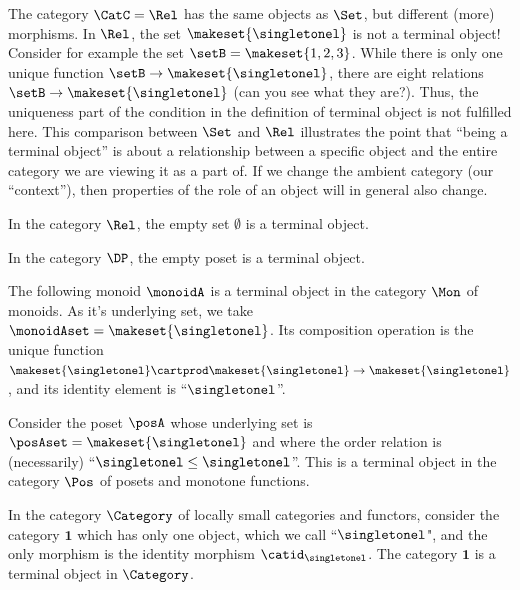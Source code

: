 \begin{remark}
    The category $\CatC = \Rel$ has the same objects as $\Set$, but different (more) morphisms.
    In $\Rel$, the set $\makeset{ \singletonel}$ is not a terminal object! Consider for example the set $\setB = \makeset{1,2,3}$.
    While there is only one unique function $\setB \to \makeset{ \singletonel}$, there are eight relations $\setB \to \makeset{ \singletonel}$ (can you see what they are?).
    Thus, the uniqueness part of the condition in the definition of terminal object is not fulfilled here.
    This comparison between $\Set$ and $\Rel$ illustrates the point that ``being a terminal object'' is about a relationship between a specific object and the entire category we are viewing it as a part of.
    If we change the ambient category (our ``context''), then properties of the role of an object will in general also change.
\end{remark}

\begin{example}\label{exa:term-obj-Rel}
    In the category $\Rel$, the empty set $\emptyset$ is a terminal object.
\end{example}

\begin{example}\label{exa:term-obj-DP}
    In the category $\DP$, the empty poset is a terminal object.
\end{example}

\begin{example}\label{exa:term-obj-Mon}
    The following monoid $\monoidA$ is a terminal object in the category $\Mon$ of monoids.
    As it's underlying set, we take $\monoidAset = \makeset{ \singletonel}$.
    Its composition operation is the unique function $\makeset{ \singletonel} \cartprod \makeset{ \singletonel} \to \makeset{ \singletonel}$, and its identity element is ``$\singletonel$''.
\end{example}

\begin{example}\label{exa:term-obj-Pos}
    Consider the poset $\posA$ whose underlying set is $\posAset = \makeset{ \singletonel}$ and where the order relation is (necessarily) ``$\singletonel \leq \singletonel$''.
    This is a terminal object in the category $\Pos$ of posets and monotone functions.
\end{example}


\begin{example}\label{exa:term-obj-Cat}
    In the category $\Category$ of locally small categories and functors, consider the category $\mathbf{1}$ which has only one object, which we call ``$\singletonel$", and the only morphism is the identity morphism $\catid_\singletonel$.
    The category $\mathbf{1}$ is a terminal object in $\Category$.
\end{example}



